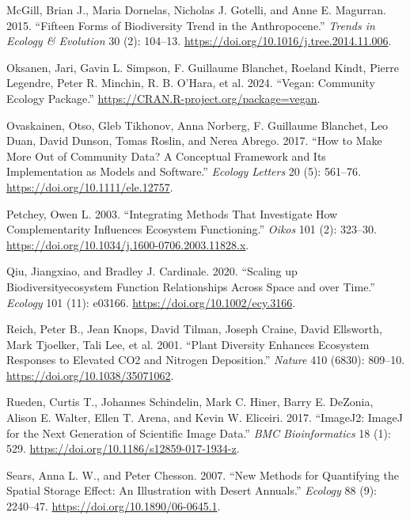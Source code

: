 \documentclass[
  letterpaper,
  DIV=11,
  numbers=noendperiod]{scrartcl}
\newlength{\cslhangindent}
\newenvironment{CSLReferences}[2] %
 {\begin{list}{}{%
  \setlength{\itemindent}{0pt}
  \setlength{\leftmargin}{0pt}
  \setlength{\parsep}{0pt}
  \ifodd #1
   \setlength{\leftmargin}{\cslhangindent}
   \setlength{\itemindent}{-1\cslhangindent}
  \fi
  \setlength{\itemsep}{#2\baselineskip}}}
 {\end{list}}
\begin{document}
\begin{CSLReferences}{1}{0}
McGill, Brian J., Maria Dornelas, Nicholas J. Gotelli, and Anne E.
Magurran. 2015. {``Fifteen Forms of Biodiversity Trend in the
Anthropocene.''} \emph{Trends in Ecology \& Evolution} 30 (2): 104--13.
\url{https://doi.org/10.1016/j.tree.2014.11.006}.

Oksanen, Jari, Gavin L. Simpson, F. Guillaume Blanchet, Roeland Kindt,
Pierre Legendre, Peter R. Minchin, R. B. O'Hara, et al. 2024. {``Vegan:
Community Ecology Package.''}
\url{https://CRAN.R-project.org/package=vegan}.

Ovaskainen, Otso, Gleb Tikhonov, Anna Norberg, F. Guillaume Blanchet,
Leo Duan, David Dunson, Tomas Roslin, and Nerea Abrego. 2017. {``How to
Make More Out of Community Data? A Conceptual Framework and Its
Implementation as Models and Software.''} \emph{Ecology Letters} 20 (5):
561--76. \url{https://doi.org/10.1111/ele.12757}.

Petchey, Owen L. 2003. {``Integrating Methods That Investigate How
Complementarity Influences Ecosystem Functioning.''} \emph{Oikos} 101
(2): 323--30. \url{https://doi.org/10.1034/j.1600-0706.2003.11828.x}.

Qiu, Jiangxiao, and Bradley J. Cardinale. 2020. {``Scaling up
Biodiversity{\textendash}ecosystem Function Relationships Across Space
and over Time.''} \emph{Ecology} 101 (11): e03166.
\url{https://doi.org/10.1002/ecy.3166}.

Reich, Peter B., Jean Knops, David Tilman, Joseph Craine, David
Ellsworth, Mark Tjoelker, Tali Lee, et al. 2001. {``Plant Diversity
Enhances Ecosystem Responses to Elevated CO2 and Nitrogen Deposition.''}
\emph{Nature} 410 (6830): 809--10.
\url{https://doi.org/10.1038/35071062}.

Rueden, Curtis T., Johannes Schindelin, Mark C. Hiner, Barry E. DeZonia,
Alison E. Walter, Ellen T. Arena, and Kevin W. Eliceiri. 2017.
{``ImageJ2: ImageJ for the Next Generation of Scientific Image Data.''}
\emph{BMC Bioinformatics} 18 (1): 529.
\url{https://doi.org/10.1186/s12859-017-1934-z}.

Sears, Anna L. W., and Peter Chesson. 2007. {``New Methods for
Quantifying the Spatial Storage Effect: An Illustration with Desert
Annuals.''} \emph{Ecology} 88 (9): 2240--47.
\url{https://doi.org/10.1890/06-0645.1}.


\end{CSLReferences}
\end{document}
